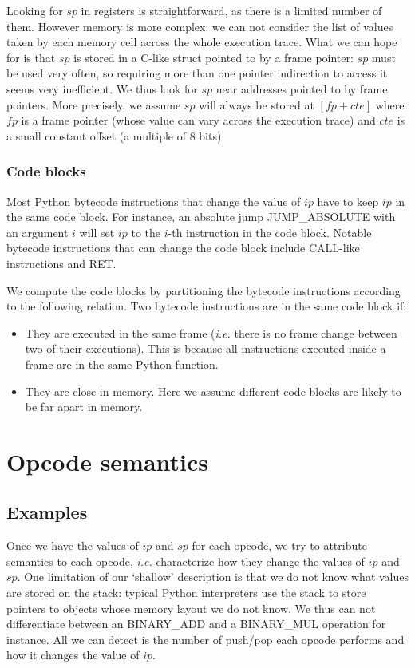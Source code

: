 \documentclass[english]{article}
\begin{document}
Looking for $sp$ in registers is straightforward, as there is a limited number of them. However memory is more complex: we can not consider the list of values taken by each memory cell across the whole execution trace. What we can hope for is that $sp$ is stored in a C-like struct pointed to by a frame pointer: $sp$ must be used very often, so requiring more than one pointer indirection to access it seems very inefficient. We thus look for $sp$ near addresses pointed to by frame pointers.  More precisely, we assume $sp$ will always be stored at $[fp + cte]$ where $fp$ is a frame pointer (whose value can vary across the execution trace) and $cte$ is a small constant offset (a multiple of 8 bits).

\subsubsection{Code blocks}

Most Python bytecode instructions that change the value of $ip$ have to keep $ip$ in the same code block. For instance, an absolute jump JUMP\_ABSOLUTE with an argument $i$ will set $ip$ to the $i$-th instruction in the code block. Notable bytecode instructions that can change the code block include CALL-like instructions and RET.

We compute the code blocks by partitioning the bytecode instructions according to the following relation. Two bytecode instructions are in the same code block if:
\begin{itemize}
	\item They are executed in the same frame (\textit{i.e.} there is no frame change between two of their executions). This is because all instructions executed inside a frame are in the same Python function.
	\item They are close in memory. Here we assume different code blocks are likely to be far apart in memory.
\end{itemize}

\section{Opcode semantics}

\subsection{Examples}

Once we have the values of $ip$ and $sp$ for each opcode, we try to attribute semantics to each opcode, \textit{i.e.} characterize how they change the values of $ip$ and $sp$. One limitation of our `shallow' description is that we do not know what values are stored on the stack: typical Python interpreters use the stack to store pointers to objects whose memory layout we do not know. We thus can not differentiate between an BINARY\_ADD and a BINARY\_MUL operation for instance. All we can detect is the number of push/pop each opcode performs and how it changes the value of $ip$.
\end{document}
